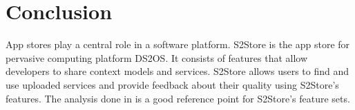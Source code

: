 \section*{Conclusion}

App stores play a central role in a software platform. S2Store is the app store for pervasive computing platform DS2OS. It consists of features that allow developers to share context models and services. S2Store allows users to find and use uploaded services and provide feedback about their quality using S2Store's features. The analysis done in \cite{Jansen} is a good reference point for S2Store's feature sets.

